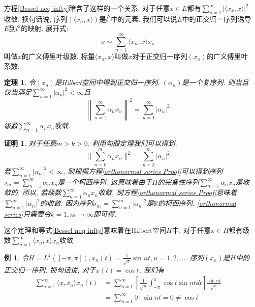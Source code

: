 \documentclass[a4paper,11pt]{article}
\theoremstyle{mystyle}
\newtheorem{theorem}{\hspace{2em}定理}[section]
\newtheorem{Proof}{\hspace{2em}证明}[section]
\newtheorem{example}{\hspace{2em}例}[section]
\begin{document}
\indent 方程\ref{Bessel neq infty}暗含了这样的一个关系, 对于任意$x\in E$都有$\sum_{n=1}^{\infty}|\langle x_k,x\rangle|^2$收敛. 换句话说, 序列$(\langle x_n,x\rangle)$是$l^2$中的元素. 我们可以说$E$中的正交归一序列诱导$E$到$l^2$的映射. 展开式:
\begin{equation}\label{expansion}
  x\sim\sum_{n=1}^{\infty}\langle x_n,x\rangle x_n
\end{equation}
叫做$x$的广义傅里叶级数. 标量$\langle x_n,x\rangle$叫做$x$对于正交归一序列$(x_n)$的广义傅里叶系数.
\begin{theorem}\label{norm in orthonormal}
  令$(x_n)$是Hilbert空间中得到正交归一序列, $(\alpha_n)$是一个复序列. 则当且仅当满足$\sum_{n=1}^{\infty}|\alpha_n|^2<\infty$且
  \begin{equation}\label{orthonormal series}
    \left\|\sum_{n=1}^{\infty}\alpha_n x_n\right\|^2=\sum_{n=1}^{\infty}|\alpha_n|^2
  \end{equation}
级数$\sum_{n=1}^{\infty}\alpha_n x_n$收敛.
\end{theorem}
\begin{Proof}
  对于任意$m>k>0$, 利用勾股定理我们可以得到,
  \begin{equation}\label{orthonormal series Proof}
    \|\sum_{n=k}^{m}\alpha_n x_n\|^2=\sum_{n=k}^{m}|\alpha_n|^2
  \end{equation}
  若$\sum_{n=1}^{\infty}|\alpha_n|^2<\infty$, 则根据方程\eqref{orthonormal series Proof}可以得到序列$s_m=\sum_{n=1}^{m}\alpha_n x_n$是一个柯西序列. 这意味着由于$H$的完备性序列$\sum_{n=1}^{\infty}\alpha_n x_n$是收敛的.
  \indent 所以, 若级数$\sum_{n=1}^{\infty}\alpha_n x_n$收敛, 则方程\eqref{orthonormal series Proof}意味着$\sum_{n=1}^{\infty}|\alpha_n|^2$的收敛. 因为序列$\sigma_m=\sum_{n=1}^{m}|\alpha_n|^2$是$\mathbb{R}$的柯西序列.
  \eqref{orthonormal series}只需要令$k=1,m\to\infty$即可得.
\end{Proof}
这个定理和等式\eqref{Bessel neq infty}意味着在Hilbert空间$H$中, 对于任意$x\in H$都有级数$\sum_{n=1}^{\infty}\langle x_n,x\rangle x_n$收敛
\begin{example}
  令$H=L^2([-\pi,\pi]),x_n(t)=\frac{1}{\sqrt{\pi}}\sin nt,n=1,2,\dots$. 序列$(x_n)$是$H$中的正交归一序列. 换句话说, 对于$x(t)=\cos t$, 我们有
  \begin{equation*}
  \begin{split}
     \sum_{n=1}^{\infty}\langle x,x_n\rangle x_n(t)&=\sum_{n=1}^{\infty}\left[\frac{1}{\sqrt{\pi}}\int_{-\pi}^{\pi}\cos t\sin ntdt\right]\frac{\sin nt}{\sqrt{\pi}} \\
       &=\sum_{n=1}^{\infty}0\cdot \sin nt=0\neq\cos t
  \end{split}
  \end{equation*}
\end{example}
\end{document}
